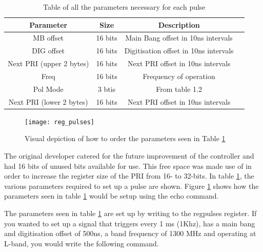 \documentclass[12pt, a4paper]{article}
\begin{document}
\begin{table}
\centering
\begin{tabular}{ |c|c|c|c| } 
 \hline
 Parameter & Size &  Description \\ 
 
 \hline 
 MB offset & 16 bits & Main Bang offset in 10ns intervals \\ 
 
 \hline
 DIG offset & 16 bits & Digitisation offset in 10ns intervals \\
 
 \hline
 Next PRI (upper 2 bytes) & 16 bits & Next PRI offset in 10ns intervals \\
 
 \hline
 Freq & 16 bits & Frequency of operation \\
 
 \hline
 Pol Mode & 3 btis & From table 1.2 \\
 
 \hline
 Next PRI (lower 2 bytes) & 16 bits & Next PRI offset in 10ns intervals\\
 \hline 
\end{tabular}
\caption{Table of all the parameters necessary for each pulse}
\label{table:1}
\end{table}

	\begin{figure}[b]
		\centering
		\texttt{[image: reg\_pulses]}
		\caption{Visual depiction of how to order the parameters seen in Table \ref{table:1}}
		\label{fig:reg_pulses}
	\end{figure}



The original developer catered for the future improvement of the controller and had 16 bits of unused bits available for use. This free space was made use of in order to increase the register size of the PRI from 16- to 32-bits. In table \ref{table:1}, the various parameters required to set up a pulse are shown. Figure \ref{fig:reg_pulses} shows how the parameters seen in table \ref{table:1} would be setup using the echo command.


The parameters seen in table \ref{table:1} are set up by writing to the reg\textunderscore pulses register. If you wanted to set up a signal that triggers every 1 ms (1Khz), has a main bang and digitisation offset of 500ns, a band frequency of 1300 MHz and operating at L-band, you would write the following command. 
\end{document}
